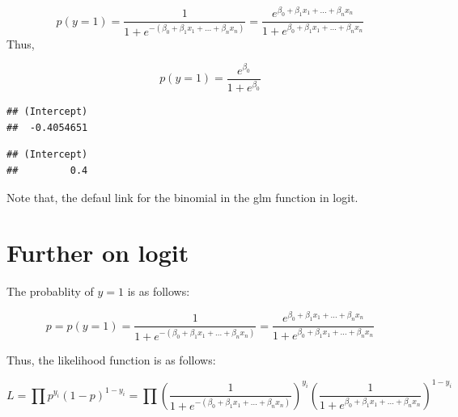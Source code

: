\documentclass[
]{book}
\newenvironment{Shaded}{\begin{snugshade}}{\end{snugshade}}
\newcommand{\DataTypeTok}[1]{\textcolor[rgb]{0.13,0.29,0.53}{#1}}
\newcommand{\DecValTok}[1]{\textcolor[rgb]{0.00,0.00,0.81}{#1}}
\newcommand{\KeywordTok}[1]{\textcolor[rgb]{0.13,0.29,0.53}{\textbf{#1}}}
\newcommand{\NormalTok}[1]{#1}
\newcommand{\OperatorTok}[1]{\textcolor[rgb]{0.81,0.36,0.00}{\textbf{#1}}}
\newcommand{\StringTok}[1]{\textcolor[rgb]{0.31,0.60,0.02}{#1}}
\begin{document}
\[p(y=1)=\frac{1}{1+e^{-(\beta_0+\beta_1x_1+...+\beta_nx_n)}}=\frac{e^{\beta_0+\beta_1x_1+...+\beta_nx_n}}{1+e^{\beta_0+\beta_1x_1+...+\beta_nx_n}}\]
Thus,

\[p(y=1)=\frac{e^{\beta_0}}{1+e^{\beta_0}}\]

\begin{Shaded}
\end{Shaded}

\begin{verbatim}
## (Intercept) 
##  -0.4054651
\end{verbatim}

\begin{Shaded}
\end{Shaded}

\begin{verbatim}
## (Intercept) 
##         0.4
\end{verbatim}

Note that, the defaul link for the binomial in the glm function in logit.

\hypertarget{further-on-logit}{%
\section{Further on logit}\label{further-on-logit}}

The probablity of \(y=1\) is as follows:

\[p=p(y=1)=\frac{1}{1+e^{-(\beta_0+\beta_1x_1+...+\beta_nx_n)}}=\frac{e^{\beta_0+\beta_1x_1+...+\beta_nx_n}}{1+e^{\beta_0+\beta_1x_1+...+\beta_nx_n}}\]

Thus, the likelihood function is as follows:

\[L=\prod p^{y_i}(1-p)^{1-y_i}=\prod (\frac{1}{1+e^{-(\beta_0+\beta_1x_1+...+\beta_nx_n)}})^{y_i}(\frac{1}{1+e^{\beta_0+\beta_1x_1+...+\beta_nx_n}})^{1-y_i}\]
\end{document}
